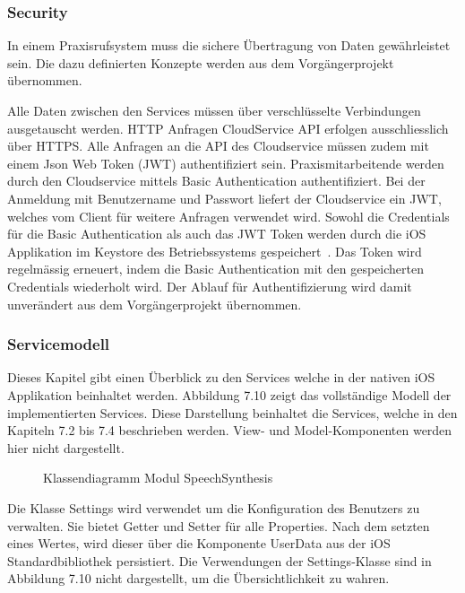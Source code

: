 \subsubsection{Security}

In einem Praxisrufsystem muss die sichere Übertragung von Daten gewährleistet sein.
Die dazu definierten Konzepte werden aus dem Vorgängerprojekt übernommen.

Alle Daten zwischen den Services müssen über verschlüsselte Verbindungen ausgetauscht werden.
HTTP Anfragen CloudService API erfolgen ausschliesslich über HTTPS\@.
Alle Anfragen an die API des Cloudservice müssen zudem mit einem Json Web Token (JWT) authentifiziert sein.
Praxismitarbeitende werden durch den Cloudservice mittels Basic Authentication authentifiziert.
Bei der Anmeldung mit Benutzername und Passwort liefert der Cloudservice ein JWT, welches vom Client für weitere Anfragen verwendet wird.
Sowohl die Credentials für die Basic Authentication als auch das JWT Token werden durch die iOS Applikation im Keystore des Betriebssystems gespeichert~\cite{ip5}.
Das Token wird regelmässig erneuert, indem die Basic Authentication mit den gespeicherten Credentials wiederholt wird.
Der Ablauf für Authentifizierung wird damit unverändert aus dem Vorgängerprojekt übernommen.

\clearpage

\subsubsection{Servicemodell}

Dieses Kapitel gibt einen Überblick zu den Services welche in der nativen iOS Applikation beinhaltet werden.
Abbildung 7.10 zeigt das vollständige Modell der implementierten Services.
Diese Darstellung beinhaltet die Services, welche in den Kapiteln 7.2 bis 7.4 beschrieben werden.
View- und Model-Komponenten werden hier nicht dargestellt.

\begin{figure}[h]
    \centering
    \begin{minipage}[b]{1\textwidth}
        \caption{Klassendiagramm Modul SpeechSynthesis}
    \end{minipage}
\end{figure}

Die Klasse Settings wird verwendet um die Konfiguration des Benutzers zu verwalten.
Sie bietet Getter und Setter für alle Properties.
Nach dem setzten eines Wertes, wird dieser über die Komponente UserData aus der iOS Standardbibliothek persistiert.
Die Verwendungen der Settings-Klasse sind in Abbildung 7.10 nicht dargestellt, um die Übersichtlichkeit zu wahren.

\clearpage
